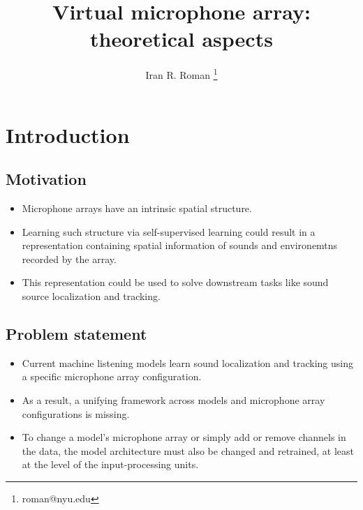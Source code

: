 \documentclass[14pt]{extarticle}
\title{Virtual microphone array: theoretical aspects}
\author{Iran R. Roman \thanks{roman@nyu.edu}}
\affil{Music and Audio Research Laboratory, New York University}
\date{}
\begin{document}
\maketitle
\tableofcontents

\vspace{.25in}

\section{Introduction}

\subsection{Motivation}

\begin{itemize}

\item Microphone arrays have an intrinsic spatial structure. 

\item Learning such structure via self-supervised learning could result in a representation containing spatial information of sounds and environemtns recorded by the array.

\item This representation could be used to solve downstream tasks like sound source localization and  tracking.

\end{itemize}

\subsection{Problem statement}

\begin{itemize}

\item Current machine listening models learn sound localization and tracking using a specific microphone array configuration.

\item As a result, a unifying framework across models and microphone array configurations is  missing.

\item To change a model's microphone array or simply add or remove channels in the data, the model architecture must also be changed and retrained, at least at the level of the input-processing units.

\end{itemize}
\end{document}
